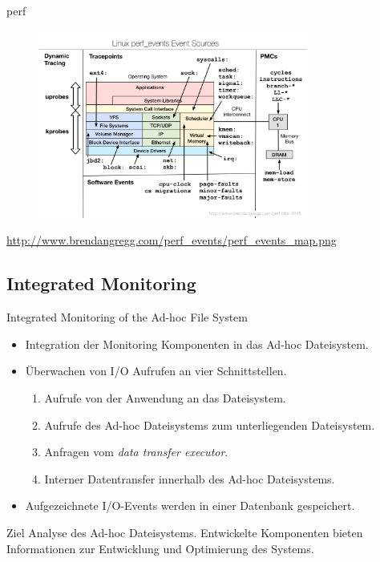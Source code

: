 \begin{frame}{perf}

    \begin{figure}
        \centering
        \includegraphics[width=0.79\textwidth]{fig/perf_events_map.png}
    \end{figure}
    \tiny{\href{perf}{http://www.brendangregg.com/perf\_events/perf\_events\_map.png}}
\end{frame}

\subsection{Integrated Monitoring}

\begin{frame}{Integrated Monitoring of the Ad-hoc File System}
    \begin{itemize}
        \item Integration der Monitoring Komponenten in das Ad-hoc Dateisystem.
        \item \"{U}berwachen von I/O Aufrufen an vier Schnittstellen.
            \begin{enumerate}
                \item Aufrufe von der Anwendung an das Dateisystem.
                \item Aufrufe des Ad-hoc Dateisystems zum unterliegenden Dateisystem.
                \item Anfragen vom \emph{data transfer executor}.
                \item Interner Datentransfer innerhalb des Ad-hoc Dateisystems.
            \end{enumerate}
        \item Aufgezeichnete I/O-Events werden in einer Datenbank gespeichert.
    \end{itemize}

    \begin{block}{Ziel}
        Analyse des Ad-hoc Dateisystems.
        Entwickelte Komponenten bieten Informationen zur Entwicklung und Optimierung des Systems.
    \end{block}
\end{frame}
